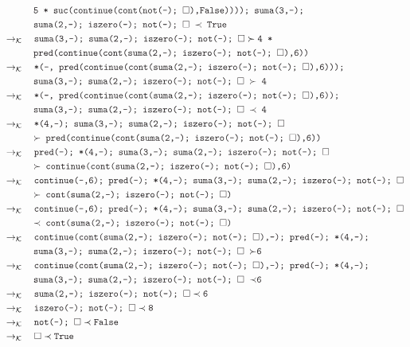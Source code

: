 \documentclass{article}
\newcommand{\tx}[1]{\textcolor{Black} {\texttt{#1}}}
\newcommand{\es}{$\square$}
\newcommand{\pop}[2]{ \tx{#1} \succ \tx{#2}}
\newcommand{\push}[2]{ \tx{#1} \prec \tx{#2}}
\newcommand{\kr}{\rightarrow_{\mathcal{K}} \quad}
\begin{document}
\begin{enumerate}
\begin{enumerate}
\begin{align*}
			&\tx {\quad \quad \quad 5 * suc(continue(cont(not(-); \es),False)))); suma(3,-);}\\
			&\tx{\quad \quad \quad suma(2,-); iszero(-); not(-); \es $\ \prec $ True} \\			
			&\kr \pop{suma(3,-); suma(2,-); iszero(-); not(-); \es} {4 *}\\
			&\tx{\quad \quad \quad pred(continue(cont(suma(2,-); iszero(-); not(-); \es),6))} \\
			&\kr \tx{*(-, pred(continue(cont(suma(2,-); iszero(-); not(-); \es),6)));}\\
			&\tx{\quad \quad \quad suma(3,-); suma(2,-); iszero(-); not(-); \es $\ \succ $ 4}\\
			&\kr \tx{*(-, pred(continue(cont(suma(2,-); iszero(-); not(-); \es),6));}\\
			&\tx{\quad \quad \quad suma(3,-); suma(2,-); iszero(-); not(-); \es $\ \prec $ 4}\\
			&\kr \tx{*(4,-); suma(3,-); suma(2,-); iszero(-); not(-); \es}\\
			&\tx{\quad \quad \quad $\succ $ pred(continue(cont(suma(2,-); iszero(-); not(-); \es),6))}\\
			&\kr \tx{pred(-); *(4,-); suma(3,-); suma(2,-); iszero(-); not(-); \es}\\
			&\tx{\quad \quad \quad $\succ $ continue(cont(suma(2,-); iszero(-); not(-); \es),6)}\\
			&\kr \tx{continue(-,6); pred(-); *(4,-); suma(3,-); suma(2,-); iszero(-); not(-); \es}\\
			&\tx{\quad \quad \quad $\succ $ cont(suma(2,-); iszero(-); not(-); \es)}\\
			&\kr \tx{continue(-,6); pred(-); *(4,-); suma(3,-); suma(2,-); iszero(-); not(-); \es}\\
			&\tx{\quad \quad \quad $\prec $ cont(suma(2,-); iszero(-); not(-); \es)}\\
			&\kr \tx{continue(cont(suma(2,-); iszero(-); not(-); \es),-); pred(-); *(4,-);}\\
			&\tx {\quad \quad \quad suma(3,-); suma(2,-); iszero(-); not(-); \es  $\ \succ $6}\\
			&\kr \tx{continue(cont(suma(2,-); iszero(-); not(-); \es),-); pred(-); *(4,-);}\\
			&\tx {\quad \quad \quad suma(3,-); suma(2,-); iszero(-); not(-); \es  $\ \prec $6}\\
			&\kr \push {suma(2,-); iszero(-); not(-); \es}{6}\\
			&\kr \push {iszero(-); not(-); \es}{8}\\
			&\kr \push {not(-); \es}{False}\\
			&\kr \push {\es}{True}\\
			\end{align*} 


\end{enumerate}
\end{enumerate}
\end{document}
